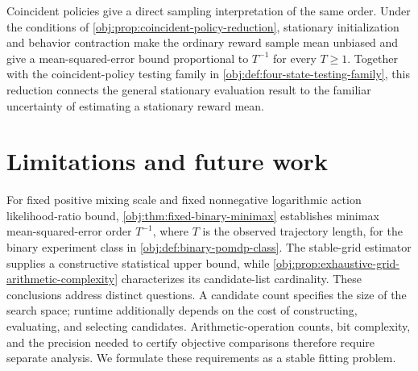 \documentclass[11pt]{article}
\begin{document}
Coincident policies give a direct sampling interpretation of the same order. Under the conditions of \cref{obj:prop:coincident-policy-reduction}, stationary initialization and behavior contraction make the ordinary reward sample mean unbiased and give a mean-squared-error bound proportional to \(T^{-1}\) for every \(T\geq1\). Together with the coincident-policy testing family in \cref{obj:def:four-state-testing-family}, this reduction connects the general stationary evaluation result to the familiar uncertainty of estimating a stationary reward mean.


\section{Limitations and future work}

For fixed positive mixing scale and fixed nonnegative logarithmic action likelihood-ratio bound, \cref{obj:thm:fixed-binary-minimax} establishes minimax mean-squared-error order \(T^{-1}\), where \(T\) is the observed trajectory length, for the binary experiment class in \cref{obj:def:binary-pomdp-class}. The stable-grid estimator supplies a constructive statistical upper bound, while \cref{obj:prop:exhaustive-grid-arithmetic-complexity} characterizes its candidate-list cardinality. These conclusions address distinct questions. A candidate count specifies the size of the search space; runtime additionally depends on the cost of constructing, evaluating, and selecting candidates. Arithmetic-operation counts, bit complexity, and the precision needed to certify objective comparisons therefore require separate analysis. We formulate these requirements as a stable fitting problem.
\end{document}
